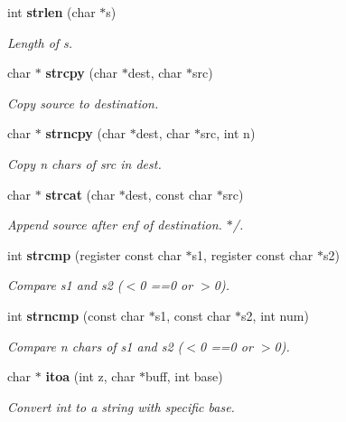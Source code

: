 \begin{CompactItemize}
\item 
int {\bf strlen} (char $\ast$s)
\begin{CompactList}\small\item\em Length of s.\item\end{CompactList}\item 
char $\ast$ {\bf strcpy} (char $\ast$dest, char $\ast$src)
\begin{CompactList}\small\item\em Copy source to destination.\item\end{CompactList}\item 
char $\ast$ {\bf strncpy} (char $\ast$dest, char $\ast$src, int n)
\begin{CompactList}\small\item\em Copy n chars of src in dest.\item\end{CompactList}\item 
char $\ast$ {\bf strcat} (char $\ast$dest, const char $\ast$src)
\begin{CompactList}\small\item\em Append source after enf of destination. $\ast$/.\item\end{CompactList}\item 
int {\bf strcmp} (register const char $\ast$s1, register const char $\ast$s2)
\begin{CompactList}\small\item\em Compare s1 and s2 ($<$0 ==0 or $>$0).\item\end{CompactList}\item 
int {\bf strncmp} (const char $\ast$s1, const char $\ast$s2, int num)
\begin{CompactList}\small\item\em Compare n chars of s1 and s2 ($<$0 ==0 or $>$0).\item\end{CompactList}\item 
char $\ast$ {\bf itoa} (int z, char $\ast$buff, int base)
\begin{CompactList}\small\item\em Convert int to a string with specific base.\item\end{CompactList}\item 

\end{CompactItemize}
